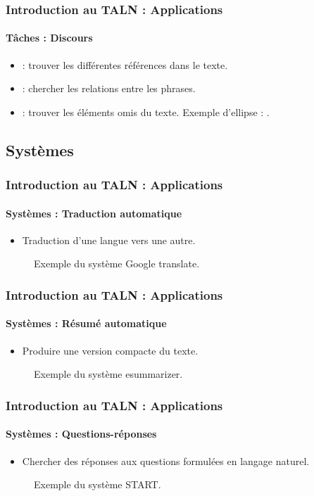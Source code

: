 \documentclass[xcolor=table]{beamer}
\begin{document}
\begin{frame}
\frametitle{Introduction au TALN : Applications}
\framesubtitle{Tâches : Discours}

\begin{itemize}
	\item {} : trouver les différentes références dans le texte. 
	\item {} : chercher les relations entre les phrases.
	\item {} : trouver les éléments omis du texte. 
	Exemple d'ellipse : .
\end{itemize}

\end{frame}

\subsection{Systèmes}

\begin{frame}
\frametitle{Introduction au TALN : Applications}
\framesubtitle{Systèmes : Traduction automatique}

\begin{itemize}
	\item Traduction d'une langue vers une autre.
\end{itemize}

\begin{figure}
	\caption{Exemple du système Google translate.}
\end{figure}

\end{frame}

\begin{frame}
\frametitle{Introduction au TALN : Applications}
\framesubtitle{Systèmes : Résumé automatique}

\begin{itemize}
	\item Produire une version compacte du texte.
\end{itemize}

\begin{figure}
	\caption{Exemple du système esummarizer.}
\end{figure}

\end{frame}

\begin{frame}
\frametitle{Introduction au TALN : Applications}
\framesubtitle{Systèmes : Questions-réponses}

\begin{itemize}
	\item Chercher des réponses aux questions formulées en langage naturel.
\end{itemize}

\begin{figure}
	\caption{Exemple du système START.}
\end{figure}

\end{frame}
\end{document}
